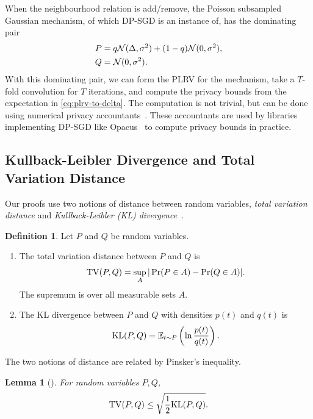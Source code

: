 \documentclass{article}
\theoremstyle{plain}
\newtheorem{lemma}[theorem]{Lemma}
\theoremstyle{definition}
\newtheorem{definition}[theorem]{Definition}
\theoremstyle{remark}
\begin{document}
When the neighbourhood relation is add/remove, the Poisson 
subsampled Gaussian mechanism, of which DP-SGD is an instance of, 
has the dominating pair~\citep{KoskelaJH20}
\begin{equation}
    \label{eq:dominating-pair}
    \begin{split}
        P &= q\mathcal{N}(\Delta, \sigma^2) + (1 - q)\mathcal{N}(0, \sigma^2), \\
        Q &= \mathcal{N}(0, \sigma^2).
    \end{split}
\end{equation}
With this dominating pair, we can form the PLRV for the mechanism, take 
a $T$-fold convolution for $T$ iterations, and
compute the privacy bounds from the expectation in \eqref{eq:plrv-to-delta}. 
The computation is not 
trivial, but can be done using numerical privacy 
accountants~\citep{KoskelaJH20,koskelaTightDifferentialPrivacy2021,GopiLW21,doroshenkoConnectDotsTighter2022a,alghamdiSaddlePointMethodDifferential2023}.
These accountants are used by libraries implementing DP-SGD like 
Opacus~\citep{yousefpourOpacusUserFriendlyDifferential2021a}
to compute privacy bounds in practice.

\subsection{Kullback-Leibler Divergence and Total Variation Distance}

Our proofs use two notions of distance between random variables, \emph{total variation distance} 
and \emph{Kullback-Leibler (KL) divergence}~\citep{kullbackInformationSufficiency1951}.
\begin{definition}
    Let $P$ and $Q$ be random variables.
    \begin{enumerate}
        \item 
        The total variation distance between $P$ and $Q$ is 
        \begin{equation}
            \mathrm{TV}(P, Q) = \sup_A |\Pr(P\in A) - \Pr(Q \in A)|.
        \end{equation}
        The supremum is over all measurable sets $A$.
        \item 
        The KL divergence between $P$ and $Q$ with densities $p(t)$ and $q(t)$ is 
        \begin{equation}
            \mathrm{KL}(P, Q) = \operatorname{\mathbb{E}}_{t\sim P}\left(\ln \frac{p(t)}{q(t)}\right).
        \end{equation}
    \end{enumerate}
\end{definition}
The two notions of distance are related by Pinsker's inequality.
\begin{lemma}[\citealp{kelbertSurveyDistancesMost2023}]
    For random variables $P, Q$,
    \begin{equation}
        \mathrm{TV}(P, Q) \leq \sqrt{\frac{1}{2}\mathrm{KL}(P, Q)}.
    \end{equation}
\end{lemma}
\end{document}

